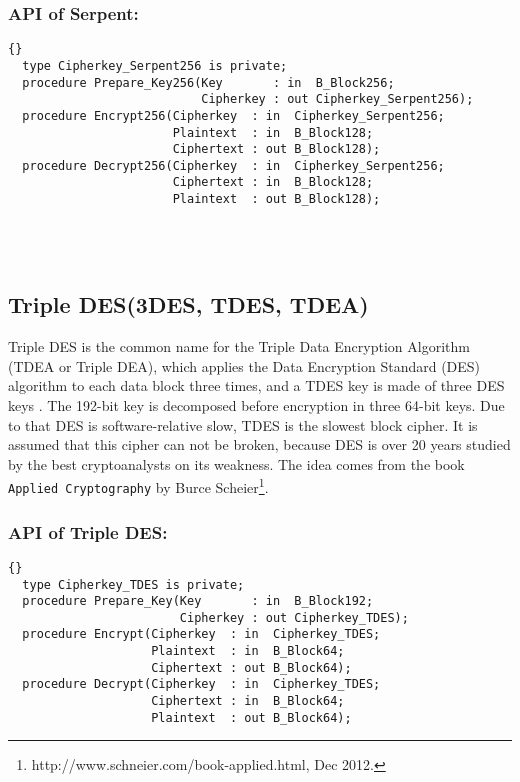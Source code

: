 \subsubsection*{API of Serpent:}
\begin{lstlisting}{}
  type Cipherkey_Serpent256 is private;
  procedure Prepare_Key256(Key       : in  B_Block256;
                           Cipherkey : out Cipherkey_Serpent256);   
  procedure Encrypt256(Cipherkey  : in  Cipherkey_Serpent256;
                       Plaintext  : in  B_Block128;
                       Ciphertext : out B_Block128); 
  procedure Decrypt256(Cipherkey  : in  Cipherkey_Serpent256;
                       Ciphertext : in  B_Block128;
                       Plaintext  : out B_Block128);
\end{lstlisting}\\ \ \\
\subsection{Triple DES(3DES, TDES, TDEA)}
Triple DES is the common name for the Triple Data Encryption Algorithm (TDEA or Triple DEA), which applies the Data Encryption Standard (DES) algorithm to each data block three times, and a TDES key is made of three DES keys \cite{DES-FIPS}. The 192-bit key is decomposed before encryption in three 64-bit keys. Due to that DES is software-relative slow, TDES is the slowest block cipher. It is assumed that this cipher can not be broken, because DES is over 20 years studied by the best cryptoanalysts on its weakness. The idea comes from the book \texttt{Applied Cryptography} by Burce Scheier\footnote{http://www.schneier.com/book-applied.html, Dec 2012.}.
\subsubsection*{API of Triple DES:}
\begin{lstlisting}{}
  type Cipherkey_TDES is private;
  procedure Prepare_Key(Key       : in  B_Block192;
                        Cipherkey : out Cipherkey_TDES);
  procedure Encrypt(Cipherkey  : in  Cipherkey_TDES;
                    Plaintext  : in  B_Block64;
                    Ciphertext : out B_Block64);
  procedure Decrypt(Cipherkey  : in  Cipherkey_TDES;
                    Ciphertext : in  B_Block64;
                    Plaintext  : out B_Block64);
\end{lstlisting}
\newpage
